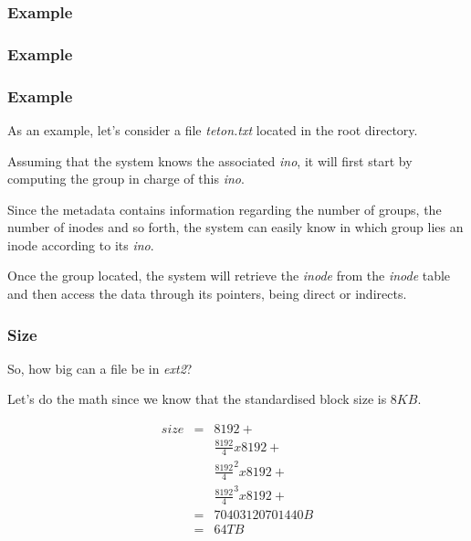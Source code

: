 
\begin{frame}
  \frametitle{Example}

  \begin{center}
  \end{center}
\end{frame}


\begin{frame}
  \frametitle{Example}

  \begin{center}
  \end{center}
\end{frame}


\begin{frame}
  \frametitle{Example}

  As an example, let's consider a file \textit{teton.txt} located in the root
  directory.

  \-

  Assuming that the system knows the associated \textit{ino}, it will first
  start by computing the group in charge of this \textit{ino}.

  \-

  Since the metadata contains information regarding the number of groups,
  the number of inodes and so forth, the system can easily know in which
  group lies an inode according to its \textit{ino}.

  \-

  Once the group located, the system will retrieve the \textit{inode} from
  the \textit{inode} table and then access the data through its pointers,
  being direct or indirects.
\end{frame}


\begin{frame}
  \frametitle{Size}

  So, how big can a file be in \textit{ext2}?

  \-

  Let's do the math since we know that the standardised block size is $8 KB$.

  \-

  \begin{eqnarray*}
    size & = & 8192 + \\
         &   & \frac{8192}{4} x 8192 + \\
         &   & \frac{8192}{4}^{2} x 8192 + \\
         &   & \frac{8192}{4}^{3} x 8192 + \\
         & = & 70403120701440 B \\
         & = & 64 TB \\
  \end{eqnarray*}
\end{frame}

